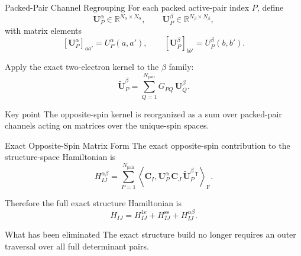 \documentclass{beamer}
\newcommand{\Frob}[2]{\left\langle #1, #2 \right\rangle_{\mathrm F}}
\newcommand{\Na}{N_{\alpha}}
\newcommand{\Nb}{N_{\beta}}
\newcommand{\Npair}{N_{\mathrm{pair}}}
\newcommand{\Cmat}{\mathbf{C}}
\newcommand{\Ua}[1]{\mathbf{U}^{\alpha}_{#1}}
\newcommand{\Ub}[1]{\widetilde{\mathbf{U}}^{\beta}_{#1}}
\begin{document}
\begin{frame}{Packed-Pair Channel Regrouping}
  For each packed active-pair index $P$, define
  \[
  \Ua{P}\in \mathbb{R}^{\Na\times\Na},
  \qquad
  \mathbf{U}^{\beta}_{P}\in \mathbb{R}^{\Nb\times\Nb},
  \]
  with matrix elements
  \[
  \left[\Ua{P}\right]_{aa'} = U_P^\alpha(a,a'),
  \qquad
  \left[\mathbf{U}^{\beta}_{P}\right]_{bb'} = U_P^\beta(b,b').
  \]

  Apply the exact two-electron kernel to the $\beta$ family:
  \[
  \Ub{P}
  =
  \sum_{Q=1}^{\Npair}
  G_{PQ}\, \mathbf{U}^{\beta}_{Q}.
  \]

  \begin{block}{Key point}
    The opposite-spin kernel is reorganized as a sum over packed-pair channels
    acting on matrices over the unique-spin spaces.
  \end{block}
\end{frame}

\begin{frame}{Exact Opposite-Spin Matrix Form}
  The exact opposite-spin contribution to the structure-space Hamiltonian is
  \[
  H_{IJ}^{\alpha\beta}
  =
  \sum_{P=1}^{\Npair}
  \Frob{\Cmat_I}{\Ua{P}\, \Cmat_J\, \Ub{P}^{\mathsf T}}.
  \]

  Therefore the full exact structure Hamiltonian is
  \[
  H_{IJ}
  =
  H_{IJ}^{1e}
  +
  H_{IJ}^{\mathrm{ss}}
  +
  H_{IJ}^{\alpha\beta}.
  \]

  \begin{block}{What has been eliminated}
    The exact structure build no longer requires an outer traversal over all
    full determinant pairs.
  \end{block}
\end{frame}
\end{document}
